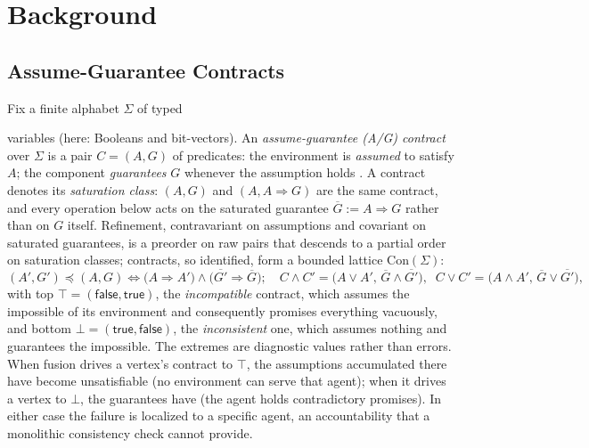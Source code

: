 \documentclass[10pt]{article}
\newif\ifshowcomments
\renewcommand{\preceq}{\preccurlyeq}
\newcommand{\Con}[1]{\text{Con}(#1)}
\newcommand{\sat}[1]{\overline{#1}}
\theoremstyle{definition}
\theoremstyle{remark}
\newcommand{\hans}[1]{%
    \ifshowcomments
        \noindent\textcolor{buzzgold}{[Hans]: #1}%
    \fi
}
\newcommand{\ai}[1]{%
    \ifshowcomments
        \noindent\textcolor{techred}{[AI Agent]: #1}%
    \fi
}
\begin{document}
\section{Background}
\label{sec:background}

\subsection{Assume-Guarantee Contracts}
\label{sec:contracts}

Fix a finite alphabet $\Sigma$ of typed \hans{This is interesting, we should expand on this aspect in the final report} \ai{Agreed; I have left your flag in place and will expand the typing discipline (and its interaction with the interface alphabets) in the final report's background.} variables (here: Booleans and bit-vectors). An \emph{assume-guarantee (A/G) contract} over $\Sigma$ is a pair $C = (A, G)$ of predicates: the environment is \emph{assumed} to satisfy $A$; the component \emph{guarantees} $G$ whenever the assumption holds \citep{benvenisteContractsSystemDesign2012}. A contract denotes its \emph{saturation class}: $(A,G)$ and $(A, A \Rightarrow G)$ are the same contract, and every operation below acts on the saturated guarantee $\sat{G} := A \Rightarrow G$ rather than on $G$ itself.
Refinement, contravariant on assumptions and covariant on saturated guarantees, is a preorder on raw pairs that descends to a partial order on saturation classes; contracts, so identified, form a bounded lattice $\Con{\Sigma}$:
\begin{equation}
(A', G') \preceq (A, G) \iff \bigl(A \Rightarrow A'\bigr) \wedge \bigl(\sat{G'} \Rightarrow \sat{G}\bigr);
\quad
C \wedge C' = \bigl(A \vee A',\, \sat{G} \wedge \sat{G'}\bigr),
\;\;
C \vee C' = \bigl(A \wedge A',\, \sat{G} \vee \sat{G'}\bigr),
\end{equation}
with top $\top = (\mathsf{false}, \mathsf{true})$, the \emph{incompatible} contract, which assumes the impossible of its environment and consequently promises everything vacuously, and bottom $\bot = (\mathsf{true}, \mathsf{false})$, the \emph{inconsistent} one, which assumes nothing and guarantees the impossible.
The extremes are diagnostic values rather than errors. When fusion drives a vertex's contract to $\top$, the assumptions accumulated there have become unsatisfiable (no environment can serve that agent); when it drives a vertex to $\bot$, the guarantees have (the agent holds contradictory promises). In either case the failure is localized to a specific agent, an accountability that a monolithic consistency check cannot provide.
\end{document}
